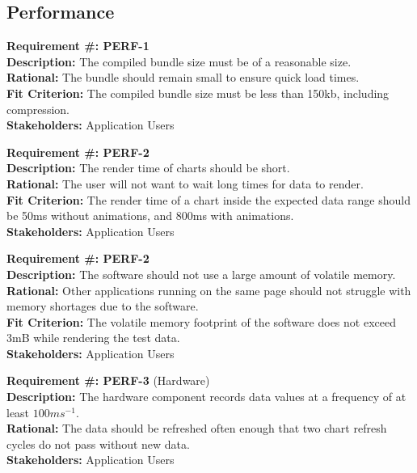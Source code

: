 \documentclass[12pt, titlepage]{article}
\begin{document}
\subsection{Performance}
\begin{flushleft}
\textbf{Requirement \#: PERF-1} \\
\textbf{Description:} The compiled bundle size must be of a reasonable size. \\
\textbf{Rational:} The bundle should remain small to ensure quick load times. \\
\textbf{Fit Criterion:} The compiled bundle size must be less than 150kb, including compression.\\
\textbf{Stakeholders:} Application Users \\
\end{flushleft}
\begin{flushleft}
\textbf{Requirement \#: PERF-2} \\
\textbf{Description:} The render time of charts should be short. \\
\textbf{Rational:} The user will not want to wait long times for data to render. \\
\textbf{Fit Criterion:} The render time of a chart inside the expected data range should be 50ms without animations, and 800ms with animations. \\
\textbf{Stakeholders:} Application Users \\
\end{flushleft}
\begin{flushleft}
\textbf{Requirement \#: PERF-2} \\
\textbf{Description:} The software should not use a large amount of volatile memory. \\
\textbf{Rational:} Other applications running on the same page should not struggle with memory shortages due to the software. \\
\textbf{Fit Criterion:} The volatile memory footprint of the software does not exceed 3mB while rendering the test data.\\
\textbf{Stakeholders:} Application Users \\
\end{flushleft}
\begin{flushleft}
\textbf{Requirement \#: PERF-3} (Hardware) \\
\textbf{Description:} The hardware component records data values at a frequency of at least $100ms^{-1}$. \\
\textbf{Rational:} The data should be refreshed often enough that two chart refresh cycles do not pass without new data. \\
\textbf{Stakeholders:} Application Users \\
\end{flushleft}
\end{document}
